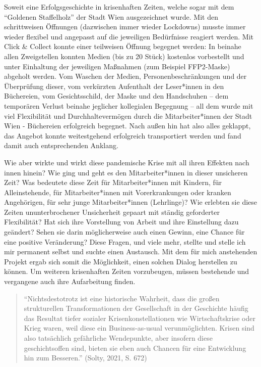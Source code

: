 \documentclass[a4paper,
fontsize=11pt,
oneside,
numbers=noperiodatend,
parskip=half-,
bibliography=totoc,
final
]{scrartcl}
\begin{document}
Soweit eine Erfolgsgeschichte in krisenhaften Zeiten, welche sogar mit
dem \enquote{Goldenen Staffelholz} der Stadt Wien ausgezeichnet wurde.
Mit den schrittweisen Öffnungen (dazwischen immer wieder Lockdowns)
musste immer wieder flexibel und angepasst auf die jeweiligen
Bedürfnisse reagiert werden. Mit Click \& Collect konnte einer
teilweisen Öffnung begegnet werden: In beinahe allen Zweigstellen
konnten Medien (bis zu 20 Stück) kostenlos vorbestellt und unter
Einhaltung der jeweiligen Maßnahmen (zum Beispiel FFP2-Maske) abgeholt
werden. Vom Waschen der Medien, Personenbeschränkungen und der
Überprüfung dieser, vom verkürzten Aufenthalt der Leser*innen in den
Büchereien, vom Gesichtsschild, der Maske und den Handschuhen -- dem
temporären Verlust beinahe jeglicher kollegialen Begegnung -- all dem
wurde mit viel Flexibilität und Durchhaltevermögen durch die
Mitarbeiter*innen der Stadt Wien - Büchereien erfolgreich begegnet. Nach
außen hin hat also alles geklappt, das Angebot konnte weitestgehend
erfolgreich transportiert werden und fand damit auch entsprechenden
Anklang.

Wie aber wirkte und wirkt diese pandemische Krise mit all ihren Effekten
nach innen hinein? Wie ging und geht es den Mitarbeiter*innen in dieser
unsicheren Zeit? Was bedeutete diese Zeit für Mitarbeiter*innen mit
Kindern, für Alleinstehende, für Mitarbeiter*innen mit Vorerkrankungen
oder kranken Angehörigen, für sehr junge Mitarbeiter*innen (Lehrlinge)?
Wie erlebten sie diese Zeiten ununterbrochener Unsicherheit gepaart mit
ständig geforderter Flexibilität? Hat sich ihre Vorstellung von Arbeit
und ihre Einstellung dazu geändert? Sehen sie darin möglicherweise auch
einen Gewinn, eine Chance für eine positive Veränderung? Diese Fragen,
und viele mehr, stellte und stelle ich mir permanent selbst und suchte
einen Austausch. Mit dem für mich anstehenden Projekt ergab sich somit
die Möglichkeit, einen solchen Dialog herstellen zu können. Um weiteren
krisenhaften Zeiten vorzubeugen, müssen bestehende und vergangene auch
ihre Aufarbeitung finden.

\begin{quote}
\enquote{Nichtsdestotrotz ist eine historische Wahrheit, dass die großen
strukturellen Transformationen der Gesellschaft in der Geschichte häufig
das Resultat tiefer sozialer Krisenkonstellationen wie Wirtschaftskrise
oder Krieg waren, weil diese ein Business-as-usual verunmöglichten.
Krisen sind also tatsächlich gefährliche Wendepunkte, aber insofern
diese geschichtsoffen sind, bieten sie eben auch Chancen für eine
Entwicklung hin zum Besseren.} (Solty, 2021, S. 672)
\end{quote}
\end{document}
